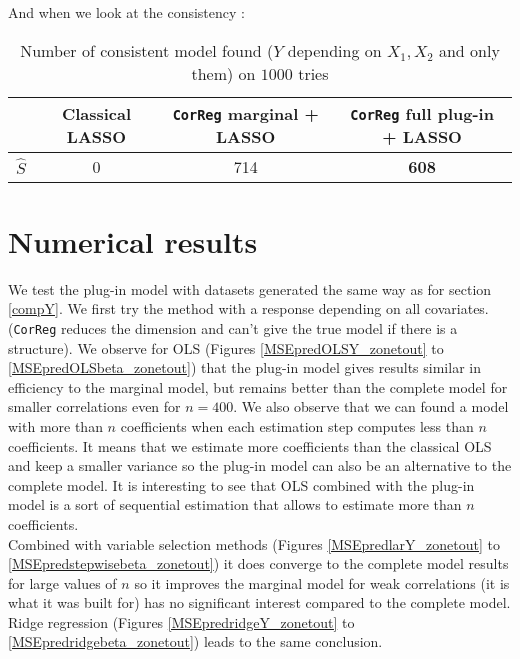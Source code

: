 \documentclass[12pt,a4paper]{report}
\begin{document}
		And when we look at the consistency :
		\begin{table}[h!]
		\centering	
		\begin{tabular}{|c|c|c|c|}
		\hline 
		 & Classical LASSO & {\tt CorReg} marginal + LASSO& {\tt CorReg} full plug-in  + LASSO \\ 
		\hline 
		$\hat{S}$ & 0 & 714 & \textbf{608} \\ 
		\hline 
		\end{tabular} 
		\caption{Number of consistent model found ($Y$ depending on $X_1,X_2$ and only them) on $1000$ tries}\label{testidentifiableGM}
		\end{table}				
				
		
		

	\section{Numerical results}
		We test the plug-in model with datasets generated the same way as for section \ref{compY}.
We first try the method with a response depending on all covariates. ({\tt CorReg} reduces the dimension and can't give the true model if there is a structure). We observe for OLS (Figures \ref{MSEpredOLSY_zonetout} to \ref{MSEpredOLSbeta_zonetout}) that the plug-in model gives results similar in efficiency to the marginal model, but remains better than the complete model for smaller  correlations even for $n=400$. We also observe that we can found a model with more than $n$ coefficients when each estimation step computes less than $n$ coefficients. It means that  we estimate more coefficients than the classical OLS and keep a smaller variance so the plug-in model can also be an alternative to the complete model. It is interesting to see that OLS combined with the plug-in model is a sort of sequential estimation that allows to estimate more than $n$ coefficients.\\
 
 
Combined with variable selection methods (Figures \ref{MSEpredlarY_zonetout} to \ref{MSEpredstepwisebeta_zonetout}) it does converge to the complete model results for large values of $n$ so it improves the marginal model for weak correlations (it is what it was built for) has no significant interest compared to the complete model. Ridge regression (Figures \ref{MSEpredridgeY_zonetout} to \ref{MSEpredridgebeta_zonetout}) leads to the same conclusion. \\
 
\end{document}
